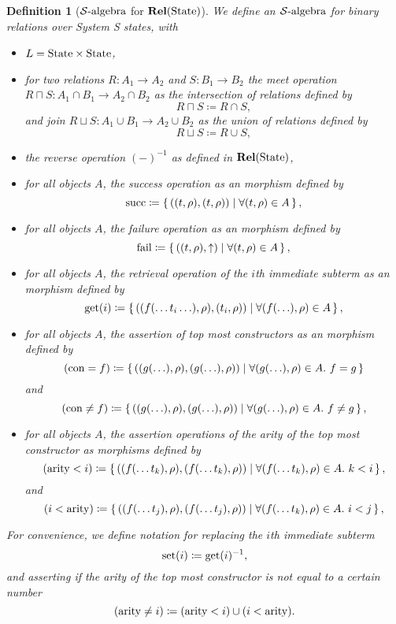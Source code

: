 \documentclass{article}
\newtheorem{definition}[theorem]{Definition}
\newcommand{\fail}{\ensuremath \text{$\uparrow$}}
\newcommand{\State}{\ensuremath \text{State}}
\newcommand{\setbuild}[2]{\ensuremath \left\{\, #1 \mid #2 \,\right\}}
\newcommand{\Rel}{\ensuremath \mathbf{Rel}}
\newcommand{\Salgebra}{\ensuremath \mathcal{S}\text{-algebra}}
\newcommand{\lfail}{\ensuremath \operatorname{fail}}
\newcommand{\lsucc}{\ensuremath \operatorname{succ}}
\newcommand{\set}{\ensuremath \operatorname{set}}
\newcommand{\get}{\ensuremath \operatorname{get}}
\newcommand{\arity}{\ensuremath \operatorname{arity}}
\newcommand{\constructor}{\ensuremath \operatorname{con}}
\begin{document}
\begin{definition}[$\Salgebra$ for $\Rel(\State)$] \normalfont
  We define an $\Salgebra$ for binary relations over System S states, with 
  \begin{itemize}
    \item $L = \State \times \State$,
    \item for two relations $R : A_1 \rightarrow A_2$ and $S : B_1 \rightarrow B_2$ the meet operation $R \sqcap S : A_1 \cap B_1 \rightarrow A_2 \cap B_2$ as the intersection of relations defined by \[R \sqcap S \coloneqq R \cap S, \] and join $R \sqcup S : A_1 \cup B_1 \rightarrow A_2 \cup B_2$ as the union of relations defined by \[ R \sqcup S \coloneqq R \cup S, \]
    \item the reverse operation $(-)^{-1}$ as defined in $\Rel(\State)$,
    \item for all objects $A$, the \emph{success} operation as an morphism defined by \[\lsucc \coloneqq \setbuild{((t,\rho),(t,\rho))}{ \forall (t,\rho) \in A }, \]
    \item for all objects $A$, the \emph{failure} operation as an morphism defined by \[ \lfail \coloneqq \setbuild{((t,\rho),\fail)}{ \forall (t,\rho) \in A }, \]
    \item for all objects $A$, the retrieval operation of the $i$th immediate subterm as an morphism defined by \[ \get(i) \coloneqq \setbuild{ ((f(\ldots t_i \ldots),\rho), (t_i,\rho)) }{ \forall (f(\ldots),\rho) \in A }, \]
    \item for all objects $A$, the assertion of top most constructors as an morphism defined by \[ (\constructor = f) \coloneqq \setbuild{ ((g(\ldots),\rho),(g(\ldots),\rho)) }{ \forall (g(\ldots),\rho) \in A.\ f = g } \] and \[ (\constructor \neq f) \coloneqq \setbuild{ ((g(\ldots),\rho),(g(\ldots),\rho)) }{ \forall (g(\ldots),\rho) \in A.\ f \neq g }, \]
    \item for all objects $A$, the assertion operations of the arity of the top most constructor as morphisms defined by \[ (\arity < i) \coloneqq \setbuild{ ((f(\ldots t_k),\rho),(f(\ldots t_k),\rho)) }{ \forall (f(\ldots t_k),\rho) \in A.\ k < i }, \] and \[ (i < \arity) \coloneqq \setbuild{ ((f(\ldots t_j),\rho),(f(\ldots t_j),\rho)) }{ \forall (f(\ldots t_k),\rho) \in A.\ i < j }, \]
  \end{itemize}

  For convenience, we define notation for replacing the $i$th immediate subterm  
  \[ \set(i) \coloneqq \get(i)^{-1}, \] and asserting if the arity of the top most constructor is not equal to a certain number \[ (\arity \neq i) \coloneqq (\arity < i) \cup (i < \arity). \]
\end{definition}
\end{document}
